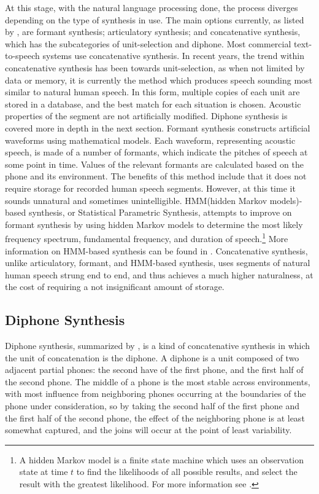 \documentclass[12pt]{article}
\begin{document}
	At this stage, with the natural language processing done, the process diverges depending on the type of synthesis in use. The main options currently, as listed by \citet{slp}, are formant synthesis; articulatory synthesis; and concatenative synthesis, which has the subcategories of unit-selection and diphone. Most commercial text-to-speech systems use concatenative synthesis. In recent years, the trend within concatenative synthesis has been towards unit-selection, as when not limited by data or memory, it is currently the method which produces speech sounding most similar to natural human speech. In this form, multiple copies of each unit are stored in a database, and the best match for each situation is chosen. Acoustic properties of the segment are not artificially modified. Diphone synthesis is covered more in depth in the next section. Formant synthesis constructs artificial waveforms using mathematical models. Each waveform, representing acoustic speech, is made of a number of formants, which indicate the pitches of speech at some point in time. Values of the relevant formants are calculated based on the phone and its environment. The benefits of this method include that it does not require storage for recorded human speech segments. However, at this time it sounds unnatural and sometimes unintelligible. HMM(hidden Markov models)-based synthesis, or Statistical Parametric Synthesis, attempts to improve on formant synthesis by using hidden Markov models to determine the most likely frequency spectrum, fundamental frequency, and duration of speech.\footnote{A hidden Markov model is a finite state machine which uses an observation state at time $t$ to find the likelihoods of all possible results, and select the result with the greatest likelihood. For more information see \citet{hmm}.} More information on HMM-based synthesis can be found in \citet{hmm_intro}. Concatenative synthesis, unlike articulatory, formant, and HMM-based synthesis, uses segments of natural human speech strung end to end, and thus achieves a much higher naturalness, at the cost of requiring a not insignificant amount of storage. \par

	\clearpage

	\subsection{Diphone Synthesis}

	Diphone synthesis, summarized by \citet{slp}, is a kind of concatenative synthesis in which the unit of concatenation is the diphone. A diphone is a unit composed of two adjacent partial phones: the second have of the first phone, and the first half of the second phone. The middle of a phone is the most stable across environments, with most influence from neighboring phones occurring at the boundaries of the phone under consideration, so by taking the second half of the first phone and the first half of the second phone, the effect of the neighboring phone is at least somewhat captured, and the joins will occur at the point of least variability. \par
\end{document}
